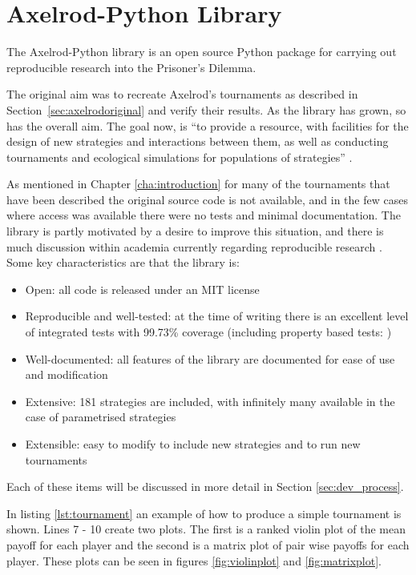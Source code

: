 \section{Axelrod-Python Library}\label{sec:axelrod-python}

The Axelrod-Python library \cite{axelrodproject} is an open source Python package for carrying out reproducible research into the Prisoner's Dilemma.

The original aim was to recreate Axelrod's tournaments as described in Section~\ref{sec:axelrodoriginal} and verify their results.
As the library has grown, so has the overall aim.
The goal now, is ``to provide a resource, with facilities for the design of new strategies and interactions between them, as well as conducting tournaments and ecological simulations for populations of strategies'' \cite{Knight2016}.

As mentioned in Chapter \ref{cha:introduction} for many of the tournaments that have been described the original source code is not available, and in the few cases where access was available there were no tests and minimal documentation.
The library is partly motivated by a desire to improve this situation, and there is much discussion within academia currently regarding reproducible research \cite{Crick2014, Hong2015, Procter2012, Sandve2013}.
Some key characteristics are that the library is:

\begin{itemize}
    \item Open: all code is released under an MIT license \cite{Rosen2004}
    \item Reproducible and well-tested: at the time of writing there is an excellent level of integrated tests with 99.73\% coverage (including property based tests: \cite{Hypothesis3.6.1})
    \item Well-documented: all features of the library are documented for ease of use and modification
    \item Extensive: 181 strategies are included, with infinitely many available in the case of parametrised strategies
    \item Extensible: easy to modify to include new strategies and to run new tournaments
\end{itemize}

Each of these items will be discussed in more detail in Section \ref{sec:dev_process}.

In listing \ref{lst:tournament} an example of how to produce a simple tournament is shown.
Lines 7 - 10 create two plots.
The first is a ranked violin plot of the mean payoff for each player and the second is a matrix plot of pair wise payoffs for each player.
These plots can be seen in figures \ref{fig:violinplot} and \ref{fig:matrixplot}.

